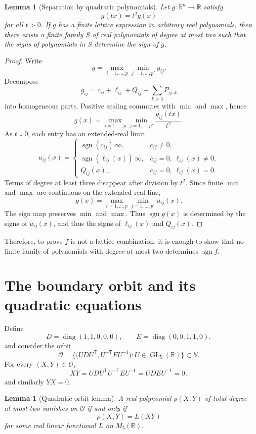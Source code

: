 \documentclass[11pt]{amsart}
\newtheorem{lemma}[theorem]{Lemma}
\theoremstyle{remark}
\DeclareMathOperator{\GL}{GL}
\DeclareMathOperator{\diag}{diag}
\DeclareMathOperator{\sgn}{sgn}
\newcommand{\tp}{{\scriptscriptstyle\mathsf{T}}}
\begin{document}
\begin{lemma}[Separation by quadratic polynomials]
Let $g:\mathbb R^n\to\mathbb R$ satisfy
\[
g(tx)=t^2g(x)
\]
for all $t>0$. 
If $g$ has a finite lattice expression in arbitrary real polynomials, then there exists a finite family $S$ of real polynomials of degree at most two such that the signs of polynomials in $S$ determine the sign of $g$.
\end{lemma}
\begin{proof}
Write
\[
g=\max_{i=1,\dots,p}\min_{j=1,\dots,p'} g_{ij}.
\]
Decompose
\[
g_{ij}=c_{ij}+\ell_{ij}+Q_{ij}+\sum_{k\ge3}P_{ij,k}
\]
into homogeneous parts. Positive scaling commutes with $\min$ and $\max$, hence
\[
g(x)=\max_{i=1,\dots,p}\min_{j=1,\dots,p'} \frac{g_{ij}(tx)}{t^2}.
\]
As $t\downarrow0$, each entry has an extended-real limit
\[
u_{ij}(x)=
\begin{cases}
\sgn(c_{ij})\,\infty,&c_{ij}\ne0,\\
\sgn(\ell_{ij}(x))\,\infty,&c_{ij}=0,\ \ell_{ij}(x)\ne0,\\
Q_{ij}(x),&c_{ij}=0,\ \ell_{ij}(x)=0.
\end{cases}
\]
Terms of degree at least three disappear after division by $t^2$. Since finite $\min$ and $\max$ are continuous on the extended real line,
\[
g(x)=\max_{i=1,\dots,p}\min_{j=1,\dots,p'} u_{ij}(x).
\]
The sign map preserves $\min$ and $\max$. Thus $\sgn g(x)$ is determined by the signs of $u_{ij}(x)$, and thus the signs of $\ell_{ij}(x)$ and $Q_{ij}(x)$.
\end{proof}

Therefore, to prove $f$ is not a lattice combination, it is enough to show that no finite family of polynomials with degree at most two determines $\sgn f$.

\section{The boundary orbit and its quadratic equations}

Define
\[
D=\diag(1,1,0,0,0),
\qquad
E=\diag(0,0,1,1,0),
\]
and consider the orbit
\begin{equation}
\mathcal O=
\bigl\{
\bigl(UDU^\tp ,U^{-\tp} EU^{-1}\bigr):U\in\GL_5(\mathbb R)
\bigr\}\subset \mathbb{V}.
\label{eq:orbit}
\end{equation}
For every $(X,Y)\in\mathcal O$,
\[
XY=UDU^\tp U^{-\tp} EU^{-1}=UDEU^{-1}=0,
\]
and similarly $YX=0$.

\begin{lemma}[Quadratic orbit lemma]\label{lem:quadratic-orbit}
A real polynomial $p(X,Y)$ of total degree at most two vanishes on $\mathcal O$ if and only if
\[
p(X,Y)=L(XY)
\]
for some real linear functional $L$ on $M_5(\mathbb R)$.
\end{lemma}
\end{document}
